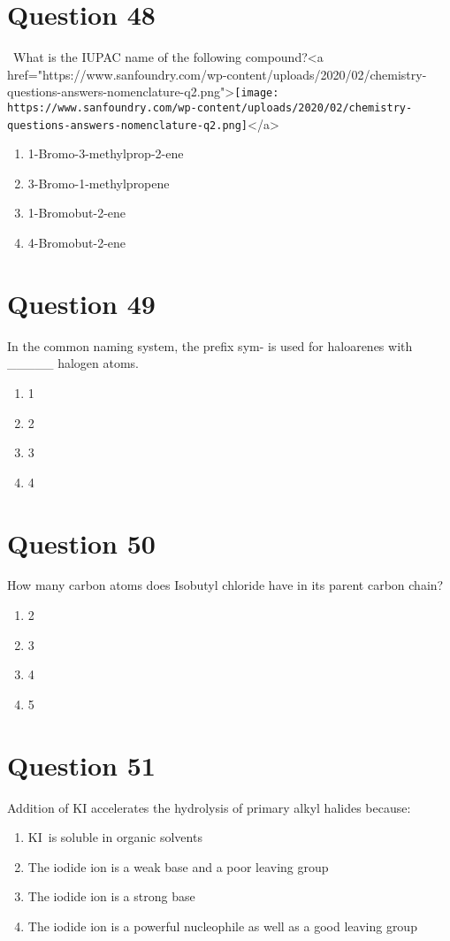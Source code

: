 \documentclass{article}
\begin{document}
\section*{Question 48}
 What is the IUPAC name of the following compound?<a href="https://www.sanfoundry.com/wp-content/uploads/2020/02/chemistry-questions-answers-nomenclature-q2.png">\texttt{[image: https://www.sanfoundry.com/wp-content/uploads/2020/02/chemistry-questions-answers-nomenclature-q2.png]}</a>
\begin{enumerate}[label=(\alph*)]
\item 1-Bromo-3-methylprop-2-ene
\item 3-Bromo-1-methylpropene
\item 1-Bromobut-2-ene
\item 4-Bromobut-2-ene
\end{enumerate}
\newpage
\section*{Question 49}
In the common naming system, the prefix sym- is used for haloarenes with _____ halogen atoms.
\begin{enumerate}[label=(\alph*)]
\item 1
\item 2
\item 3
\item 4
\end{enumerate}
\newpage
\section*{Question 50}
How many carbon atoms does Isobutyl chloride have in its parent carbon chain?
\begin{enumerate}[label=(\alph*)]
\item 2
\item 3
\item 4
\item 5
\end{enumerate}
\newpage
\section*{Question 51}
Addition of \(\mathrm{K}\mathrm{I}\) accelerates the hydrolysis of primary alkyl halides because:
\begin{enumerate}[label=(\alph*)]
\item \(\mathrm{K}\mathrm{I}\) is soluble in organic solvents
\item The iodide ion is a weak base and a poor leaving group
\item The iodide ion is a strong base
\item The iodide ion is a powerful nucleophile as well as a good leaving group
\end{enumerate}
\newpage
\end{document}
